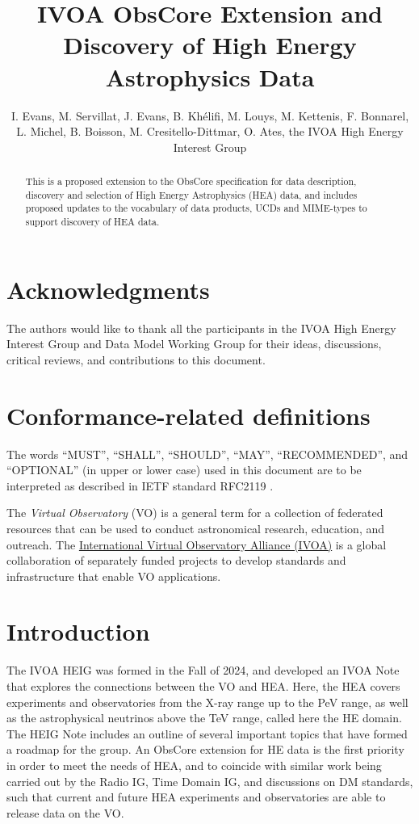\documentclass[11pt,a4paper]{ivoa}
\title{IVOA ObsCore Extension and Discovery of High Energy Astrophysics Data}
\author{I. Evans, M. Servillat, J. Evans, B. Khélifi, M. Louys, M. Kettenis, F. Bonnarel, L. Michel, B. Boisson, M. Cresitello-Dittmar, O. Ates, the IVOA High Energy Interest Group}
\begin{document}
\begin{abstract}
This is a proposed extension to the ObsCore specification for data description, discovery and selection of High Energy Astrophysics (HEA) data, and includes proposed updates to the vocabulary of data products, UCDs and MIME-types to support discovery of HEA data.  
\end{abstract}


\section*{Acknowledgments}

The authors would like to thank all the participants in the IVOA High Energy Interest Group and Data Model Working Group for their ideas, discussions, critical reviews, and contributions to this document.


\section*{Conformance-related definitions}

The words ``MUST'', ``SHALL'', ``SHOULD'', ``MAY'', ``RECOMMENDED'', and ``OPTIONAL'' (in upper or lower case) used in this document are to be interpreted as described in IETF standard RFC2119 \citep{std:RFC2119}.

The \emph{Virtual Observatory} (VO) is a general term for a collection of federated resources that can be used to conduct astronomical research, education, and outreach.
The \href{https://www.ivoa.net}{International Virtual Observatory Alliance (IVOA)} is a global collaboration of separately funded projects to develop standards and infrastructure that enable VO applications.


\section{Introduction}

The \gls{IVOA} \gls{HEIG} was formed in the Fall of 2024, and developed an \gls{IVOA} Note \citep{2024ivoa.note.heig} that explores the connections between the \gls{VO} and \gls{HEA}. Here, the \gls{HEA} covers experiments and observatories from the X-ray range up to the PeV range, as well as the astrophysical neutrinos above the TeV range, called here the \gls{HE} domain. The HEIG Note includes an outline of several important topics that have formed a roadmap for the group. An ObsCore \citep{2017ivoa.spec.0509L} extension for \gls{HE} data is the first priority in order to meet the needs of HEA, and to coincide with similar work being carried out by the Radio IG, Time Domain IG, and discussions on DM standards, such that current and future \gls{HEA} experiments and observatories are able to release data on the \gls{VO}.
\end{document}

